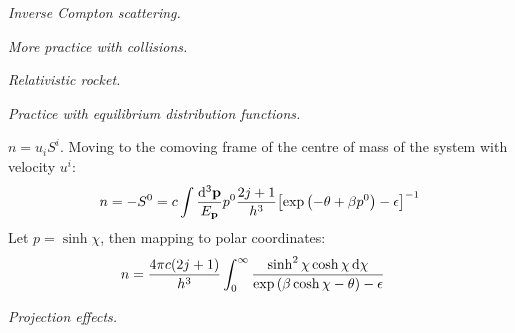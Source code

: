 \documentclass{report}
\begin{document}
\begin{subquests}
\begin{subquests}
		\item \emph{Inverse Compton scattering.}
	\end{subquests}
	

	\item \emph{More practice with collisions.}

	\item \emph{Relativistic rocket.}

	\item \emph{Practice with equilibrium distribution functions.}
	\begin{subquests}
		\item $n = u_i S^i$. Moving to the comoving frame of the centre of mass of the system with velocity $u^i$:
		\begin{align*}
			n & = -S^0 = c\int \frac{\dd^3 \vb p}{E_{\vb p}} p^0 \frac{2j+1}{h^3}\bqty{\exp\pqty{-\theta+\beta p^0} - \epsilon}^{-1} \\
		\end{align*}
		Let $p = \sinh \chi$, then mapping to polar coordinates:
		\begin{align*}
			n & = \frac{4\pi c(2j+1)}{h^3} \int_0^{\infty} \frac{\sinh^2 \chi \cosh \chi \dd{\chi}}{\exp\pqty{\beta\cosh\chi - \theta} - \epsilon}
		\end{align*}
	\end{subquests}

	\item \emph{Projection effects.}


\end{subquests}
\end{document}
